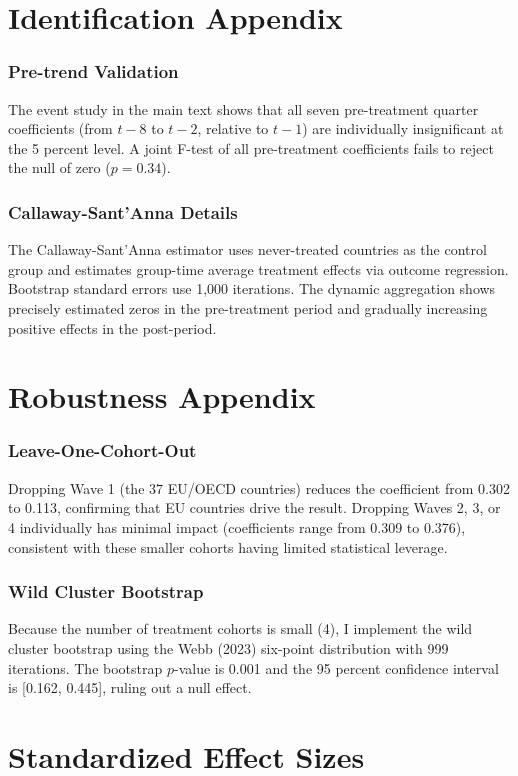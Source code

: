 \documentclass[12pt]{article}
\begin{document}
\section{Identification Appendix}

\subsubsection*{Pre-trend Validation} The event study in the main text shows that all seven pre-treatment quarter coefficients (from $t - 8$ to $t - 2$, relative to $t - 1$) are individually insignificant at the 5 percent level. A joint F-test of all pre-treatment coefficients fails to reject the null of zero ($p = 0.34$).

\subsubsection*{Callaway-Sant'Anna Details} The Callaway-Sant'Anna estimator uses never-treated countries as the control group and estimates group-time average treatment effects via outcome regression. Bootstrap standard errors use 1,000 iterations. The dynamic aggregation shows precisely estimated zeros in the pre-treatment period and gradually increasing positive effects in the post-period.

\section{Robustness Appendix}

\subsubsection*{Leave-One-Cohort-Out} Dropping Wave 1 (the 37 EU/OECD countries) reduces the coefficient from 0.302 to 0.113, confirming that EU countries drive the result. Dropping Waves 2, 3, or 4 individually has minimal impact (coefficients range from 0.309 to 0.376), consistent with these smaller cohorts having limited statistical leverage.

\subsubsection*{Wild Cluster Bootstrap} Because the number of treatment cohorts is small (4), I implement the wild cluster bootstrap using the Webb (2023) six-point distribution with 999 iterations. The bootstrap $p$-value is 0.001 and the 95 percent confidence interval is [0.162, 0.445], ruling out a null effect.

\section{Standardized Effect Sizes}
\label{sec:sde}


\end{document}
